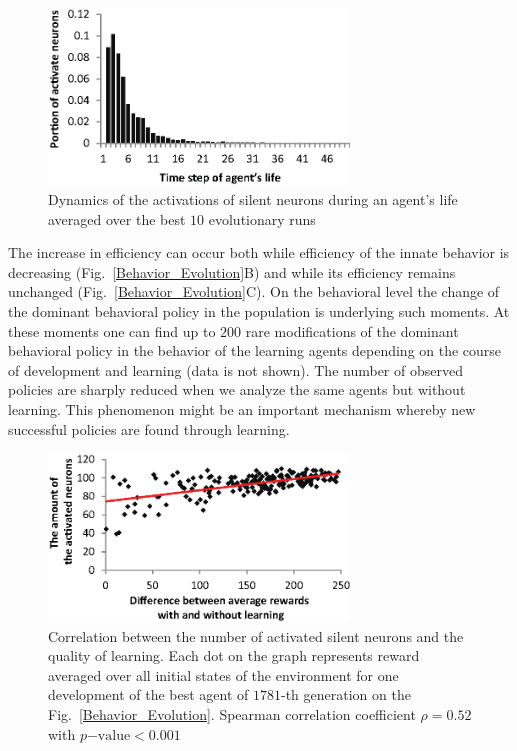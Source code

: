 \documentclass[letterpaper]{article}
\begin{document}
\begin{figure}[!b]
\begin{center}
\includegraphics[width=8cm]{Fig4.eps}
\caption{Dynamics of the activations of silent neurons during an agent's life averaged over the best $10$ evolutionary runs}
\label{Activations_dynamics}
\end{center}
\end{figure}

The increase in efficiency can occur both while efficiency of the innate behavior is decreasing (Fig.~\ref{Behavior_Evolution}B) and while its efficiency remains unchanged (Fig.~\ref{Behavior_Evolution}C). On the behavioral level the change of the dominant behavioral policy in the population is underlying such moments. At these moments one can find up to $200$ rare modifications of the dominant behavioral policy in the behavior of the learning agents depending on the course of development and learning (data is not shown). The number of observed policies are sharply reduced when we analyze the same agents but without learning. This phenomenon might be an important mechanism whereby new successful policies are found through learning.

\begin{figure}[!b]
\begin{center}
\includegraphics[width=8cm]{Fig5.eps}
\caption{Correlation between the number of activated silent neurons and the quality of learning. Each dot on the graph represents reward averaged over all initial states of the environment for one development of the best agent of $1781$-th generation on the Fig.~\ref{Behavior_Evolution}. Spearman correlation coefficient $\rho=0.52$ with $p\mathrm{-value}<0.001$}
\label{Neurons_Learning_Correlation}
\end{center}
\end{figure}
\end{document}
